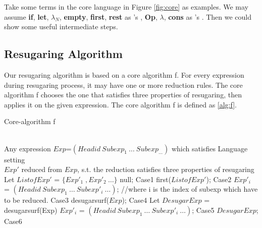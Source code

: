 Take some terms in the core language in Figure \ref{fig:core} as examples.
We may assume {\bfseries if}, {\bfseries let}, {\bfseries $\lambda _{N}$}, {\bfseries empty}, {\bfseries first}, {\bfseries rest} as 's , {\bfseries Op}, {\bfseries $\lambda$}, {\bfseries cons} as 's . Then we could show some useful intermediate steps.


\subsection{Resugaring Algorithm}

Our resugaring algorithm is based on a core algorithm f. For every expression during resugaring process, it may have one or more reduction rules. The core algorithm f chooses the one that satisfies three properties of resugaring, then applies it on the given expression. The core algorithm f is defined as \ref{alg:f}.
\begin{algorithm}
	\caption{Core-algorithm f}
	\label{alg:f}     %
	\begin{algorithmic}[1]       %
		\REQUIRE ~~\\      %
		Any expression $Exp$=$(Headid~Subexp_{1}~\ldots~Subexp_{\ldots})$ which satisfies Language setting
		\ENSURE ~~\\     %
		$Exp'$ reduced from $Exp$, s.t. the reduction satisfies three properties of resugaring
		\STATE     Let $ListofExp'$ = $\{Exp'_{1}\;,Exp'_{2}~\ldots\}$
		\RETURN null; \hfill Case1
		\RETURN first($ListofExp'$); \hfill Case2
		\ELSE
		\RETURN $Exp'_{i}$ = $(Headid~Subexp_{1}~\ldots~Subexp'_{i}~\ldots)$; //where i is the index of subexp which have to be reduced. \hfill Case3
		\ENDIF
		\ELSE
		\RETURN desugarsurf($Exp$); \hfill Case4
		\ELSE
		\STATE Let $DesugarExp$ = desugarsurf(Exp)
		\RETURN $Exp'_{i}$ = $(Headid~Subexp_{1}~\ldots~Subexp'_{i}~\ldots)$; \hfill Case5
		\ELSE
		\RETURN $DesugarExp$; \hfill Case6
		\ENDIF
		\ENDIF
		\ENDIF

	\end{algorithmic}
\end{algorithm}

